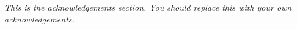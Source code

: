 \emph{This is the acknowledgements section. You should replace this with your own acknowledgements.}

\lipsum[7-8]